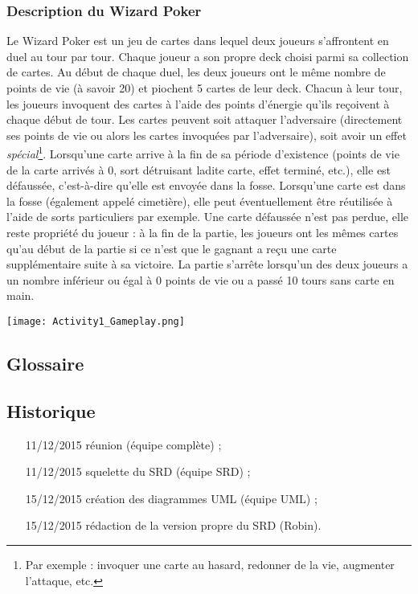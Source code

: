 \documentclass{article}
\begin{document}
        \subsubsection{Description du Wizard Poker}
            Le Wizard Poker est un jeu de cartes dans lequel deux joueurs s'affrontent en \gls{duel} au tour par tour. Chaque joueur a son propre \gls{deck}
            choisi parmi sa collection de cartes. Au début de chaque duel, les deux joueurs ont le même nombre de points de vie (à savoir 20) et piochent 5
            cartes de leur \gls{deck}. Chacun à leur tour, les joueurs invoquent des cartes à l'aide des points d'énergie qu'ils reçoivent à chaque début de tour.
            Les cartes peuvent soit attaquer l'adversaire (directement ses points de vie ou alors les cartes invoquées par l'adversaire), soit avoir
            un effet \textit{spécial}\footnote{Par exemple : invoquer une carte au hasard, redonner de la vie, augmenter l'attaque, etc.}. Lorsqu'une carte
            arrive à la fin de sa période d'existence (points de vie de la carte arrivés à 0, sort détruisant ladite carte, effet terminé, etc.), elle est
            défaussée, c'est-à-dire qu'elle est envoyée dans la \gls{fosse}. Lorsqu'une carte est dans la fosse (également appelé cimetière), elle
            peut éventuellement être réutilisée à l'aide de sorts particuliers par exemple. Une carte défaussée n'est pas perdue, elle reste propriété du joueur :
            à la fin de la partie, les joueurs ont les mêmes cartes qu'au début de la partie si ce n'est que le gagnant a reçu une carte supplémentaire
            suite à sa victoire. La partie s'arrête lorsqu'un des deux joueurs a un nombre inférieur ou égal à 0 points de vie ou a passé 10 tours sans carte en main.
            \begin{center}\texttt{[image: Activity1\_Gameplay.png]}\end{center}

    \subsection{Glossaire}  %
        \printglossary[type=glossary, style=noIndex, title=]

    \subsection{Historique}
        \begin{itemize}
            \item[11/12/2015] réunion (équipe complète) ;
            \item[11/12/2015] squelette du SRD (équipe SRD) ;
            \item[15/12/2015] création des diagrammes UML (équipe UML) ;
            \item[15/12/2015] rédaction de la version propre du SRD (Robin).
        \end{itemize}
\end{document}
